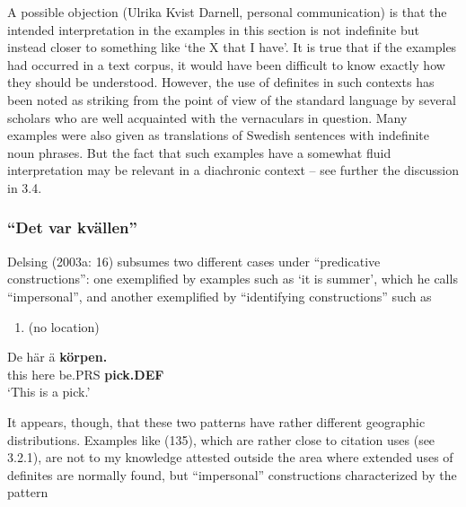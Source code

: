 A possible objection (Ulrika Kvist Darnell, personal communication) is that the intended interpretation in the examples in this section is not indefinite but instead closer to something like ‘the X that I have’. It is true that if the examples had occurred in a text corpus, it would have been difficult to know exactly how they should be understood. However, the use of definites in such contexts has been noted as striking from the point of view of the standard language by several scholars who are well acquainted with the vernaculars in question. Many examples were also given as translations of Swedish sentences with indefinite noun phrases. But the fact that such examples have a somewhat fluid interpretation may be relevant in a diachronic context – see further the discussion in 3.4. 

\subsubsection[ “Det var kvällen”]{\rmfamily  “Det var kvällen”}
\label{bkm:Ref224379336}%
Delsing (2003a: 16) subsumes two different cases under “predicative constructions”: one exemplified by examples such as  ‘it is summer’, which he calls “impersonal”, and another exemplified by “identifying constructions” such as 

\begin{enumerate} %
\item 
\label{bkm:Ref224115132}(no location)

\end{enumerate} %
\ea\label{}
\gll De  här  ä  \textbf{körpen.}\\


this  here  be.PRS  \textbf{pick.DEF}\\ %


‘This is a pick.’
\z


It appears, though, that these two patterns have rather different geographic distributions. Examples like (135), which are rather close to citation uses (see 3.2.1), are not to my knowledge attested outside the area where extended uses of definites are normally found, but “impersonal” constructions characterized by the pattern

